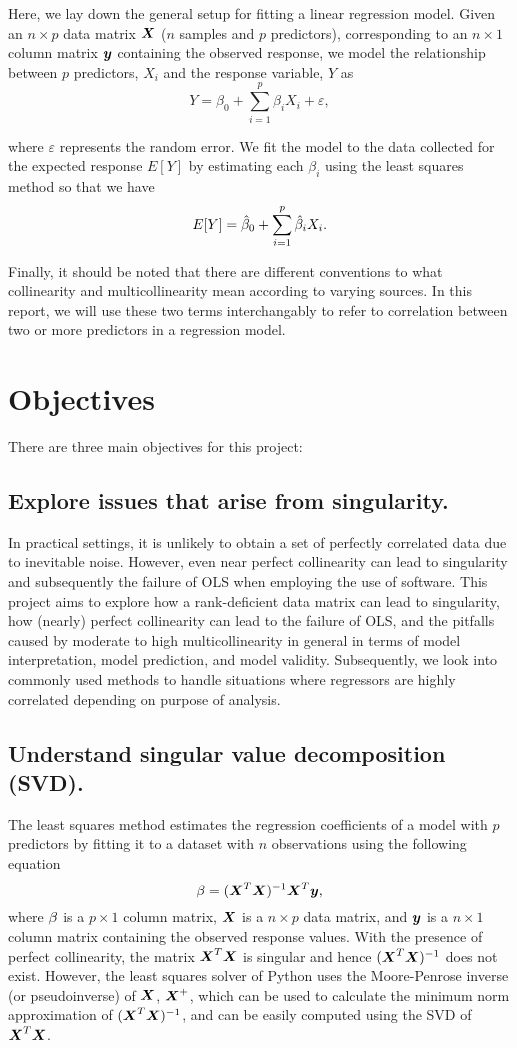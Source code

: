 \documentclass[12pt]{article}
\newcommand{\gbh}{\hat{\gb}}
\begin{document}
	Here, we lay down the general setup for fitting a linear regression model. Given an $n\times p$ data matrix $\boldsymbol{X}$ ($n$ samples and $p$ predictors), corresponding to an $n\times 1$ column matrix $\boldsymbol{y}$ containing the observed response, we model the relationship between $p$ predictors, $X_i$  and the response variable, $Y$ as
	$$Y=\beta_0+\sum_{i=1}^{p}\beta_i X_i+\varepsilon,$$
	
	where $\varepsilon$ represents the random error. We fit the model to the data collected for the expected response $E[Y]$ by estimating each $\beta_i$ using the least squares method so that we have
	$$E[Y]=\gbh_0+\sum_{i=1}^{p}\gbh_iX_i.$$
	
	
	Finally, it should be noted that there are different conventions to what collinearity and multicollinearity mean according to varying sources. In this report, we will use these two terms interchangably to refer to correlation between two or more predictors in a regression model.
	
	\section{Objectives}
	
	There are three main objectives for this project:
	\subsection{Explore issues that arise from singularity.}
	
	In practical settings, it is unlikely to obtain a set of perfectly correlated data due to inevitable noise. However, even near perfect collinearity can lead to singularity and subsequently the failure of OLS when employing the use of software. This project aims to explore how a rank-deficient data matrix can lead to singularity, how (nearly) perfect collinearity can lead to the failure of OLS, and the pitfalls caused by moderate to high multicollinearity in general in terms of model interpretation, model prediction, and model validity. Subsequently, we look into commonly used methods to handle situations where regressors are highly correlated depending on purpose of analysis.
	
	\subsection{Understand singular value decomposition (SVD).}
	
	The least squares method estimates the regression coefficients of a model with $p$ predictors by fitting it to a dataset with $n$ observations using the following equation
	$$\mathbf{\beta}=(\boldsymbol{X}^T\boldsymbol{X})^{-1}\boldsymbol{X}^T\boldsymbol{y},$$
	where $\mathbf{\beta}$ is a $p\times 1$ column matrix, $\boldsymbol{X}$ is a $n\times p$ data matrix, and $\boldsymbol{y}$ is a $n\times 1$ column matrix containing the observed response values. With the presence of perfect collinearity, the matrix $\boldsymbol{X}^T\boldsymbol{X}$ is singular and hence $(\boldsymbol{X}^T\boldsymbol{X})^{-1}$ does not exist. However, the least squares solver of Python uses the Moore-Penrose inverse (or pseudoinverse) of $\boldsymbol{X}$, $\boldsymbol{X}^+$, which can be used to calculate the minimum norm approximation of $(\boldsymbol{X}^T\boldsymbol{X})^{-1}$, and can be easily computed using the SVD of $\boldsymbol{X}^T\boldsymbol{X}$.
	
\end{document}
